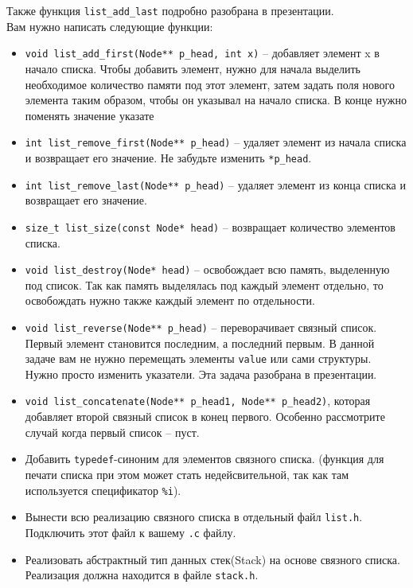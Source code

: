 \documentclass{article}
\begin{document}
Также функция \texttt{list\_add\_last} подробно разобрана в презентации.\\
Вам нужно написать следующие функции:
\begin{itemize}
\item \texttt{void list\_add\_first(Node** p\_head, int x)} -- добавляет элемент x в начало списка. Чтобы добавить элемент, нужно для начала выделить необходимое количество памяти под этот элемент, затем задать поля нового элемента таким образом, чтобы он указывал на начало списка. В конце нужно поменять значение указате
\item \texttt{int list\_remove\_first(Node** p\_head)} -- удаляет элемент из начала списка и возвращает его значение. Не забудьте изменить \texttt{*p\_head}.

\item \texttt{int list\_remove\_last(Node** p\_head)} -- удаляет элемент из конца списка и возвращает его значение. 
\item \texttt{size\_t list\_size(const Node* head)} -- возвращает количество элементов списка.
\item \texttt{void list\_destroy(Node* head)} -- освобождает всю память, выделенную под список. Так как память выделялась под каждый элемент отдельно, то освобождать нужно также каждый элемент по отдельности.

\item \texttt{void list\_reverse(Node** p\_head)} -- переворачивает связный список. Первый элемент становится последним, а последний первым. В данной задаче вам не нужно перемещать элементы \texttt{value} или сами структуры. Нужно просто изменить указатели. Эта задача разобрана в презентации.

\item \texttt{void list\_concatenate(Node** p\_head1, Node** p\_head2)}, которая добавляет второй связный список в конец первого. Особенно рассмотрите случай когда первый список -- пуст.


\item Добавить \texttt{typedef}-синоним для элементов связного списка. (функция для печати списка при этом может стать недейсвительной, так как там используется спецификатор \texttt{\%i}).
\item Вынести всю реализацию связного списка в отдельный файл \texttt{list.h}. Подключить этот файл к вашему \texttt{.c} файлу.
\item Реализовать абстрактный тип данных стек(Stack) на основе связного списка. Реализация должна находится в файле \texttt{stack.h}.
\end{itemize}
\newpage
\end{document}
